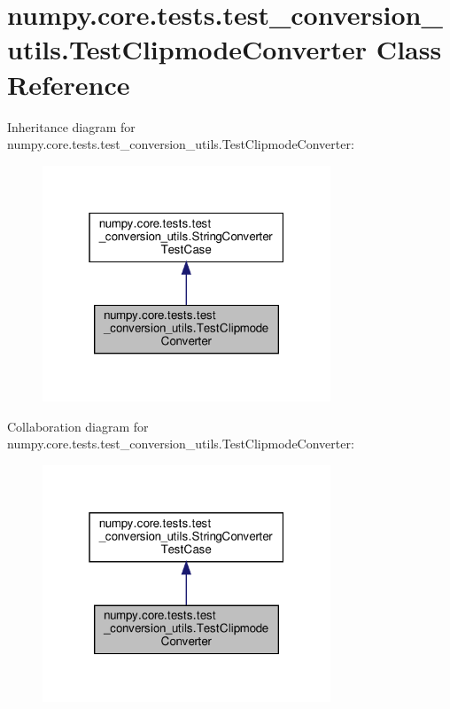 \hypertarget{classnumpy_1_1core_1_1tests_1_1test__conversion__utils_1_1TestClipmodeConverter}{}\section{numpy.\+core.\+tests.\+test\+\_\+conversion\+\_\+utils.\+Test\+Clipmode\+Converter Class Reference}
\label{classnumpy_1_1core_1_1tests_1_1test__conversion__utils_1_1TestClipmodeConverter}


Inheritance diagram for numpy.\+core.\+tests.\+test\+\_\+conversion\+\_\+utils.\+Test\+Clipmode\+Converter\+:
\nopagebreak
\begin{figure}[H]
\begin{center}
\leavevmode
\includegraphics[width=244pt]{classnumpy_1_1core_1_1tests_1_1test__conversion__utils_1_1TestClipmodeConverter__inherit__graph}
\end{center}
\end{figure}


Collaboration diagram for numpy.\+core.\+tests.\+test\+\_\+conversion\+\_\+utils.\+Test\+Clipmode\+Converter\+:
\nopagebreak
\begin{figure}[H]
\begin{center}
\leavevmode
\includegraphics[width=244pt]{classnumpy_1_1core_1_1tests_1_1test__conversion__utils_1_1TestClipmodeConverter__coll__graph}
\end{center}
\end{figure}
